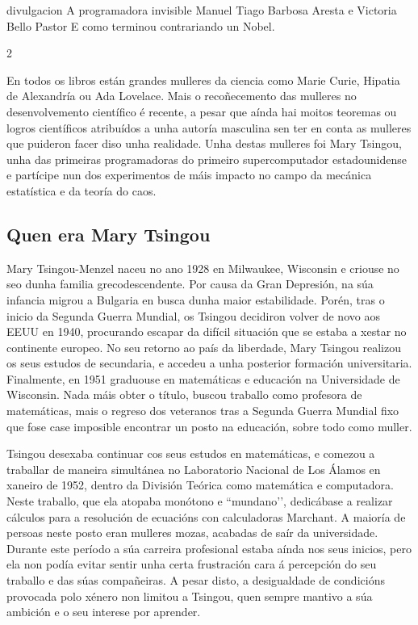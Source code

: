 \Artigo%
{divulgacion}%
{A programadora invisible}%
{Manuel Tiago Barbosa Aresta e Victoria Bello Pastor}%
{E como terminou contrariando un Nobel.}%


\begin{multicols}{2}


En todos os libros están grandes mulleres da ciencia como Marie Curie, Hipatia
de Alexandría ou Ada Lovelace. Mais o recoñecemento das mulleres no
desenvolvemento científico é recente, a pesar que aínda hai moitos teoremas ou
logros científicos atribuídos a unha autoría masculina sen ter en conta as
mulleres que puideron facer diso unha realidade. Unha destas mulleres foi Mary
Tsingou, unha das primeiras programadoras do primeiro supercomputador
estadounidense e partícipe nun dos experimentos de máis impacto no campo da
mecánica estatística e da teoría do caos.

\subsection*{Quen era Mary Tsingou}

Mary Tsingou-Menzel naceu no ano 1928 en Milwaukee, Wisconsin e criouse no seo
dunha familia grecodescendente. Por causa da Gran Depresión, na súa infancia
migrou a Bulgaria en busca dunha maior estabilidade. Porén, tras o inicio da
Segunda Guerra Mundial, os Tsingou decidiron volver de novo aos EEUU en 1940,
procurando escapar da difícil situación que se estaba a xestar no continente
europeo. No seu retorno ao país da liberdade, Mary Tsingou realizou os seus
estudos de secundaria, e accedeu a unha posterior formación universitaria.
Finalmente, en 1951 graduouse en matemáticas e educación na Universidade de
Wisconsin. Nada máis obter o título, buscou traballo como profesora de
matemáticas, mais o regreso dos veteranos tras a Segunda Guerra Mundial fixo
que fose case imposible encontrar un posto na educación, sobre todo como
muller.

Tsingou desexaba continuar cos seus estudos en matemáticas, e comezou a
traballar de maneira simultánea no Laboratorio Nacional de Los Álamos en
xaneiro de 1952, dentro da División Teórica como matemática e computadora.
Neste traballo, que ela atopaba monótono e ``mundano’’, dedicábase a realizar
cálculos para a resolución de ecuacións con calculadoras Marchant. A maioría de
persoas neste posto eran mulleres mozas, acabadas de saír da universidade.
Durante este período a súa carreira profesional estaba aínda nos seus inicios,
pero ela non podía evitar sentir unha certa frustración cara á
percepción do seu traballo e das súas compañeiras. A pesar disto, a
desigualdade de condicións provocada polo xénero non limitou a Tsingou, quen
sempre mantivo a súa ambición e o seu interese por aprender.


\end{multicols}
